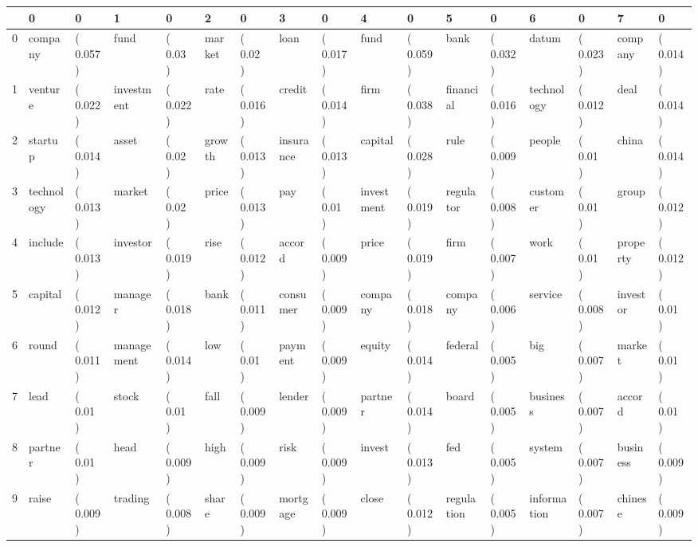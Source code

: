 \begin{tabular}{lllllllllllllllll}
\toprule
{} &           0 &          0 &           1 &          0 &       2 &          0 &          3 &          0 &           4 &          0 &           5 &          0 &            6 &          0 &         7 &          0 \\
\midrule
0 &     company &  ( 0.057 ) &        fund &   ( 0.03 ) &  market &   ( 0.02 ) &       loan &  ( 0.017 ) &        fund &  ( 0.059 ) &        bank &  ( 0.032 ) &        datum &  ( 0.023 ) &   company &  ( 0.014 ) \\
1 &     venture &  ( 0.022 ) &  investment &  ( 0.022 ) &    rate &  ( 0.016 ) &     credit &  ( 0.014 ) &        firm &  ( 0.038 ) &   financial &  ( 0.016 ) &   technology &  ( 0.012 ) &      deal &  ( 0.014 ) \\
2 &     startup &  ( 0.014 ) &       asset &   ( 0.02 ) &  growth &  ( 0.013 ) &  insurance &  ( 0.013 ) &     capital &  ( 0.028 ) &        rule &  ( 0.009 ) &       people &   ( 0.01 ) &     china &  ( 0.014 ) \\
3 &  technology &  ( 0.013 ) &      market &   ( 0.02 ) &   price &  ( 0.013 ) &        pay &   ( 0.01 ) &  investment &  ( 0.019 ) &   regulator &  ( 0.008 ) &     customer &   ( 0.01 ) &     group &  ( 0.012 ) \\
4 &     include &  ( 0.013 ) &    investor &  ( 0.019 ) &    rise &  ( 0.012 ) &     accord &  ( 0.009 ) &       price &  ( 0.019 ) &        firm &  ( 0.007 ) &         work &   ( 0.01 ) &  property &  ( 0.012 ) \\
5 &     capital &  ( 0.012 ) &     manager &  ( 0.018 ) &    bank &  ( 0.011 ) &   consumer &  ( 0.009 ) &     company &  ( 0.018 ) &     company &  ( 0.006 ) &      service &  ( 0.008 ) &  investor &   ( 0.01 ) \\
6 &       round &  ( 0.011 ) &  management &  ( 0.014 ) &     low &   ( 0.01 ) &    payment &  ( 0.009 ) &      equity &  ( 0.014 ) &     federal &  ( 0.005 ) &          big &  ( 0.007 ) &    market &   ( 0.01 ) \\
7 &        lead &   ( 0.01 ) &       stock &   ( 0.01 ) &    fall &  ( 0.009 ) &     lender &  ( 0.009 ) &     partner &  ( 0.014 ) &       board &  ( 0.005 ) &     business &  ( 0.007 ) &    accord &   ( 0.01 ) \\
8 &     partner &   ( 0.01 ) &        head &  ( 0.009 ) &    high &  ( 0.009 ) &       risk &  ( 0.009 ) &      invest &  ( 0.013 ) &         fed &  ( 0.005 ) &       system &  ( 0.007 ) &  business &  ( 0.009 ) \\
9 &       raise &  ( 0.009 ) &     trading &  ( 0.008 ) &   share &  ( 0.009 ) &   mortgage &  ( 0.009 ) &       close &  ( 0.012 ) &  regulation &  ( 0.005 ) &  information &  ( 0.007 ) &   chinese &  ( 0.009 ) \\
\bottomrule
\end{tabular}
